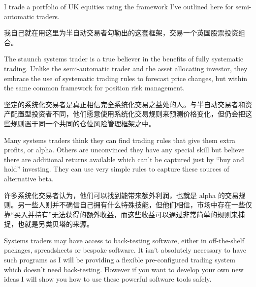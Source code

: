 \bipairgap

\begin{englishblock} I trade a portfolio of UK equities using the framework I've outlined here for semi-automatic traders. \end{englishblock}

\begin{chineseblock}我自己就在用这里为半自动交易者勾勒出的这套框架，交易一个英国股票投资组合。\end{chineseblock}


\begin{englishblock} The staunch systems trader is a true believer in the benefits of fully systematic trading. Unlike the semi-automatic trader and the asset allocating investor, they embrace the use of systematic trading rules to forecast price changes, but within the same common framework for position risk management. \end{englishblock}

\begin{chineseblock}坚定的系统化交易者是真正相信完全系统化交易之益处的人。与半自动交易者和资产配置型投资者不同，他们愿意使用系统化交易规则来预测价格变化，但仍会把这些规则置于同一个共同的仓位风险管理框架之中。\end{chineseblock}

\bipairgap

\begin{englishblock} Many systems traders think they can find trading rules that give them extra profits, or alpha. Others are unconvinced they have any special skill but believe there are additional returns available which can't be captured just by ``buy and hold'' investing. They can use very simple rules to capture these sources of alternative beta. \end{englishblock}

\begin{chineseblock}许多系统化交易者认为，他们可以找到能带来额外利润，也就是 alpha 的交易规则。另一些人则并不确信自己拥有什么特殊技能，但他们相信，市场中存在一些仅靠“买入并持有”无法获得的额外收益，而这些收益可以通过非常简单的规则来捕捉，也就是另类贝塔的来源。\end{chineseblock}

\bipairgap

\begin{englishblock} Systems traders may have access to back-testing software, either in off-the-shelf packages, spreadsheets or bespoke software. It isn't absolutely necessary to have such programs as I will be providing a flexible pre-configured trading system which doesn't need back-testing. However if you want to develop your own new ideas I will show you how to use these powerful software tools safely. \end{englishblock}

